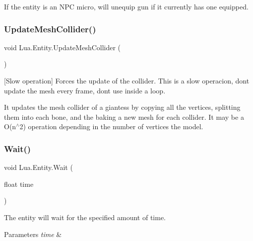 If the entity is an N\+PC micro, will unequip gun if it currently has one equipped. 

\mbox{\label{class_lua_1_1_entity_a6be24874965a4015e7fd8244fa345220}} 
\subsubsection{\texorpdfstring{UpdateMeshCollider()}{UpdateMeshCollider()}}
{\footnotesize\ttfamily void Lua.\+Entity.\+Update\+Mesh\+Collider (\begin{DoxyParamCaption}{ }\end{DoxyParamCaption})}



\mbox{[}Slow operation\mbox{]} Forces the update of the collider. This is a slow operacion, don\textquotesingle{}t update the mesh every frame, don\textquotesingle{}t use inside a loop. 

It updates the mesh collider of a giantess by copying all the vertices, splitting them into each bone, and the baking a new mesh for each collider. It may be a O(n$^\wedge$2) operation depending in the number of vertices the model. \mbox{\label{class_lua_1_1_entity_a58a5bb200f7182dea5e622f036f05bf3}} 
\subsubsection{\texorpdfstring{Wait()}{Wait()}}
{\footnotesize\ttfamily void Lua.\+Entity.\+Wait (\begin{DoxyParamCaption}\item[{float}]{time }\end{DoxyParamCaption})}



The entity will wait for the specified amount of time. 


\begin{DoxyParams}{Parameters}
{\em time} & \\
\hline
\end{DoxyParams}
\mbox{\label{class_lua_1_1_entity_aa4d1d044edd1f9b9dfb4b310c49b8761}} 
